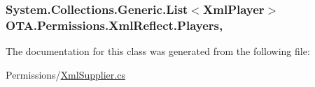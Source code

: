 \subsubsection[{Players}]{\setlength{\rightskip}{0pt plus 5cm}System.\+Collections.\+Generic.\+List$<${\bf Xml\+Player}$>$ O\+T\+A.\+Permissions.\+Xml\+Reflect.\+Players\hspace{0.3cm}{\ttfamily [get]}, {\ttfamily [set]}}\label{class_o_t_a_1_1_permissions_1_1_xml_reflect_a7bca868f279fd30dccb9e88f1930aa76}


The documentation for this class was generated from the following file\+:\begin{DoxyCompactItemize}
\item 
Permissions/\hyperlink{_xml_supplier_8cs}{Xml\+Supplier.\+cs}\end{DoxyCompactItemize}

